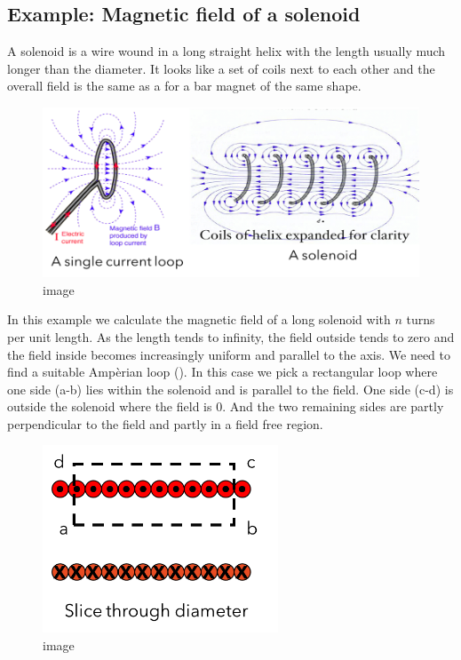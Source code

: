 \documentclass[
]{book}
\begin{document}
\hypertarget{example-magnetic-field-of-a-solenoid}{%
\subsection{Example: Magnetic field of a solenoid}\label{example-magnetic-field-of-a-solenoid}}

A solenoid is a wire wound in a long straight helix with the length
usually much longer than the diameter. It looks like a set of coils next
to each other and the overall field is the same as a for a bar magnet of
the same shape.

\begin{figure}
\centering
\includegraphics[width=120mm,height=\textheight]{Figures/loopNsolenoid.png}
\caption{image}
\end{figure}

In this example we calculate the magnetic field of a long solenoid with
\(n\) turns per unit length. As the length tends to infinity, the field
outside tends to zero and the field inside becomes increasingly uniform
and parallel to the axis. We need to find a suitable Ampèrian loop ().
In this case we pick a rectangular loop where one side (a-b) lies within
the solenoid and is parallel to the field. One side (c-d) is outside the
solenoid where the field is 0. And the two remaining sides are partly
perpendicular to the field and partly in a field free region.

\begin{figure}
\centering
\includegraphics[width=70mm,height=\textheight]{Figures/amperianLoop.png}
\caption{image}
\end{figure}
\end{document}
